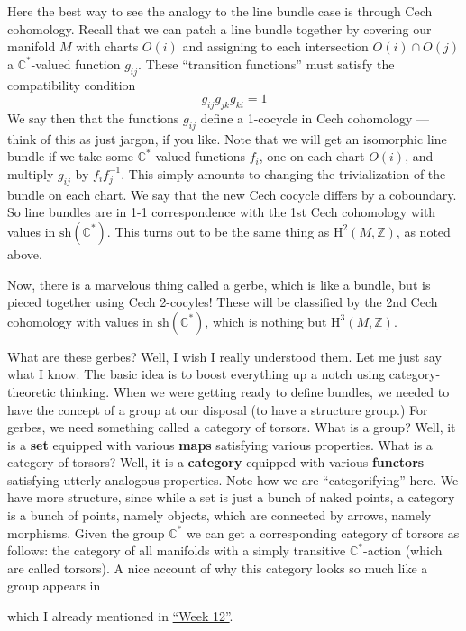 \documentclass{article}
\def\tightlist{}
\renewcommand{\texttt}[1]{%
  \begingroup
  \ttfamily
  \begingroup\lccode`~=`/\lowercase{\endgroup\def~}{/\discretionary{}{}{}}%
  \begingroup\lccode`~=`[\lowercase{\endgroup\def~}{[\discretionary{}{}{}}%
  \begingroup\lccode`~=`.\lowercase{\endgroup\def~}{.\discretionary{}{}{}}%
  \catcode`/=\active\catcode`[=\active\catcode`.=\active
  \scantokens{#1\noexpand}%
  \endgroup
}
\begin{document}
Here the best way to see the analogy to the line bundle case is through
Cech cohomology. Recall that we can patch a line bundle together by
covering our manifold \(M\) with charts \(O(i)\) and assigning to each
intersection \(O(i) \cap O(j)\) a \(\mathbb{C}^*\)-valued function
\(g_{ij}\). These ``transition functions'' must satisfy the compatibility
condition 
\[g_{ij} g_{jk} g_{ki} = 1\] 
We say then that the functions
\(g_{ij}\) define a 1-cocycle in Cech cohomology --- think of this as
just jargon, if you like. Note that we will get an isomorphic line
bundle if we take some \(\mathbb{C}^*\)-valued functions \(f_i\), one
on each chart \(O(i)\), and multiply \(g_{ij}\) by \(f_ if_j^{-1}\).
This simply amounts to changing the trivialization of the bundle on each
chart. We say that the new Cech cocycle differs by a coboundary. So line
bundles are in 1-1 correspondence with the 1st Cech cohomology with
values in \(\mathrm{sh}(\mathbb{C}^*)\). This turns out to be the same
thing as \(\mathrm{H}^2(M,\mathbb{Z})\), as noted above.

Now, there is a marvelous thing called a gerbe, which is like a bundle,
but is pieced together using Cech 2-cocyles! These will be classified by
the 2nd Cech cohomology with values in \(\mathrm{sh}(\mathbb{C}^*)\),
which is nothing but \(\mathrm{H}^3(M,\mathbb{Z})\).

What are these gerbes? Well, I wish I really understood them. Let me
just say what I know. The basic idea is to boost everything up a notch
using category-theoretic thinking. When we were getting ready to define
bundles, we needed to have the concept of a group at our disposal (to
have a structure group.) For gerbes, we need something called a category
of torsors. What is a group? Well, it is a \textbf{set} equipped with
various \textbf{maps} satisfying various properties. What is a category
of torsors? Well, it is a \textbf{category} equipped with various
\textbf{functors} satisfying utterly analogous properties. Note how we
are ``categorifying'' here. We have more structure, since while a set is
just a bunch of naked points, a category is a bunch of points, namely
objects, which are connected by arrows, namely morphisms. Given the
group \(\mathbb{C}^*\) we can get a corresponding category of torsors as
follows: the category of all manifolds with a simply transitive
\(\mathbb{C}^*\)-action (which are called torsors). A nice account of
why this category looks so much like a group appears in

\noindent
which I already mentioned in \protect\hyperlink{week12}{``Week 12''}.
\end{document}
